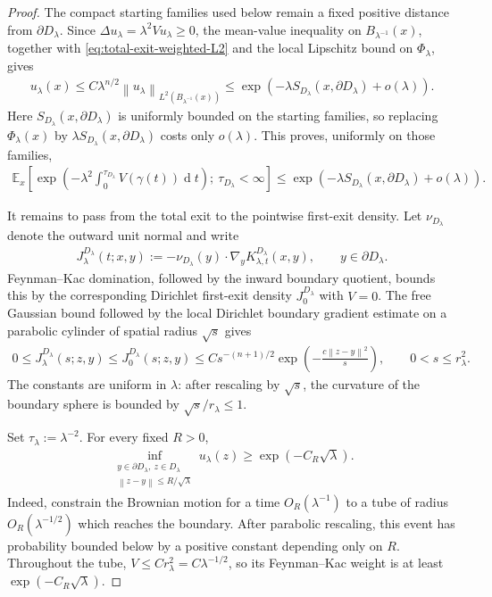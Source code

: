 \documentclass[a4paper,10pt]{article}
\numberwithin{equation}{section}
\theoremstyle{plain}
\theoremstyle{plain}
\theoremstyle{plain}
\theoremstyle{plain}
\theoremstyle{plain}
\theoremstyle{remark}
\theoremstyle{definition}
\newcommand{\EE}{\mathbb{E}}
\newcommand\norm[1]{\left\lVert#1\right\rVert}
\newcommand{\dif}{\operatorname{d}\!} %
\newcommand{\eq}[1]{\begin{align*}#1\end{align*}}
\newcommand{\eql}[1]{\begin{align}#1\end{align}}
\newcommand{\br}[1]{\left(#1\right)}
\begin{document}
\begin{proof}
The compact starting families used below remain a fixed positive
distance from $\partial D_\lambda$. Since
$\Delta u_\lambda=\lambda^2Vu_\lambda\geq0$, the mean-value
inequality on $B_{\lambda^{-1}}(x)$, together with
\cref{eq:total-exit-weighted-L2} and the local Lipschitz bound on
$\Phi_\lambda$, gives
\eq{
u_\lambda(x)
\leq
C\lambda^{n/2}
\norm{u_\lambda}_{L^2(B_{\lambda^{-1}}(x))}
\leq
\exp\left(
-\lambda S_{D_\lambda}\br{x,\partial D_\lambda}
+o(\lambda)
\right).
}
Here $S_{D_\lambda}(x,\partial D_\lambda)$ is uniformly bounded on
the starting families, so replacing $\Phi_\lambda(x)$ by
$\lambda S_{D_\lambda}(x,\partial D_\lambda)$ costs only
$o(\lambda)$.
This proves, uniformly on those families,
\eql{
\EE_x\left[
\exp\left(
-\lambda^2\int_0^{\tau_{D_\lambda}}V(\gamma(t))\dif{t}
\right);
\ \tau_{D_\lambda}<\infty
\right]
\leq
\exp\left(
-\lambda S_{D_\lambda}\br{x,\partial D_\lambda}+o(\lambda)
\right).
\label{eq:total-exit-agmon-resolvent-bound}
}

It remains to pass from the total exit to the pointwise first-exit
density. Let $\nu_{D_\lambda}$ denote the outward unit normal and
write
\eq{
J_\lambda^{D_\lambda}(t;x,y)
:=
-\nu_{D_\lambda}(y)\cdot
\nabla_yK_{\lambda,t}^{D_\lambda}(x,y),
\qquad
y\in\partial D_\lambda.
}
Feynman--Kac domination, followed by the inward boundary quotient,
bounds this by the corresponding Dirichlet first-exit density
$J_0^{D_\lambda}$ with $V=0$. The free Gaussian bound followed by the
local Dirichlet boundary gradient estimate on a parabolic cylinder of
spatial radius $\sqrt{s}$ gives
\eql{
0
\leq
J_\lambda^{D_\lambda}(s;z,y)
\leq
J_0^{D_\lambda}(s;z,y)
\leq
Cs^{-(n+1)/2}
\exp\left(
-\frac{c\norm{z-y}^2}{s}
\right),
\qquad
0<s\leq r_\lambda^2.
\label{eq:exterior-ball-poisson-kernel-bound}
}
The constants are uniform in $\lambda$: after rescaling by
$\sqrt{s}$, the curvature of the boundary sphere is bounded by
$\sqrt{s}/r_\lambda\leq1$.

Set $\tau_\lambda:=\lambda^{-2}$. For every fixed $R>0$,
\eql{
\inf_{\substack{
y\in\partial D_\lambda,\ z\in D_\lambda\\
\norm{z-y}\leq R/\sqrt\lambda
}}
u_\lambda(z)
\geq
\exp\br{-C_R\sqrt\lambda}.
\label{eq:total-exit-boundary-layer-lower}
}
Indeed, constrain the Brownian motion for a time $O_R(\lambda^{-1})$
to a tube of radius $O_R(\lambda^{-1/2})$ which reaches the boundary.
After parabolic rescaling, this event has probability bounded below
by a positive constant depending only on $R$. Throughout the tube,
$V\leq Cr_\lambda^2=C\lambda^{-1/2}$, so its Feynman--Kac weight is
at least $\exp\br{-C_R\sqrt\lambda}$.


\end{proof}
\end{document}
